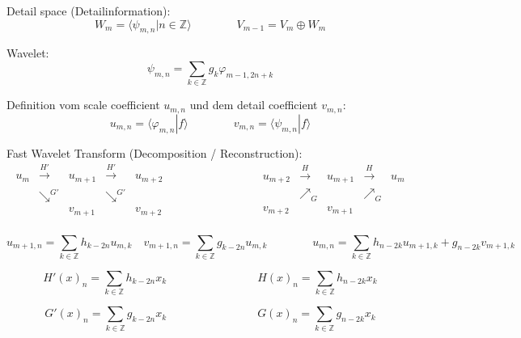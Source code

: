 Detail space (Detailinformation):
\[
	W_m = \langle \psi_{m,n} | n \in \mathbb{Z} \rangle
	\qquad \qquad
	V_{m-1} = V_m \oplus W_m
\]

Wavelet:
\[
	\psi_{m,n} = \sum_{k \in \mathbb{Z}} g_k \varphi_{m-1,2n+k} 
\]

Definition vom scale coefficient $u_{m,n}$ und dem detail coefficient $v_{m,n}$:
\[
	u_{m,n} = \langle \varphi_{m,n}|f \rangle
	\qquad \qquad
	v_{m,n} = \langle \psi_{m,n}|f \rangle
\]

Fast Wavelet Transform (Decomposition / Reconstruction):
\[
	\boxed{\begin{array}{ccccc}
		u_m & \xrightarrow{H'} & u_{m+1} & \xrightarrow{H'} & u_{m+2} \\
		& \searrow^{G'} & & \searrow^{G'} & \\
		& & v_{m+1} & & v_{m+2} \\
	\end{array}}
	\qquad \qquad \qquad \qquad
	\boxed{\begin{array}{ccccc}
		u_{m+2} & \xrightarrow{H} & u_{m+1} & \xrightarrow{H} & u_{m} \\
		& \nearrow_G & & \nearrow_G & \\
		v_{m+2}& & v_{m+1} & & \\
	\end{array}}
\]

\[  
	u_{m+1,n} = \sum_{k \in  \mathbb{Z}} h_{k-2n} u_{m,k} \quad v_{m+1,n} = \sum_{k \in  \mathbb{Z}} g_{k-2n} u_{m,k}
	\qquad \qquad
	u_{m,n} = \sum_{k \in  \mathbb{Z}} h_{n-2k} u_{m+1,k} + g_{n-2k} v_{m+1,k}
\]

\[
	H'(x)_n = \sum_{k \in  \mathbb{Z}} h_{k-2n} x_k
	\qquad \qquad \qquad \qquad
	H(x)_n = \sum_{k \in  \mathbb{Z}} h_{n-2k} x_k
\]

\[
	G'(x)_n = \sum_{k \in  \mathbb{Z}} g_{k-2n} x_k
	\qquad \qquad \qquad \qquad
	G(x)_n = \sum_{k \in  \mathbb{Z}} g_{n-2k} x_k
\]
